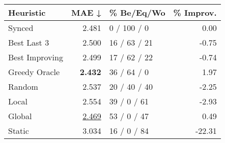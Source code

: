 \begin{tabular}{lrlr}
\toprule
\textbf{Heuristic} & \textbf{MAE ↓} & \textbf{\% Be/Eq/Wo} & \textbf{\% Improv.} \\
\midrule
            Synced &          2.481 &          0 / 100 / 0 &                0.00 \\
\midrule
       Best Last 3 &          2.500 &         16 / 63 / 21 &               -0.75 \\
    Best Improving &          2.499 &         17 / 62 / 22 &               -0.74 \\
\addlinespace
     Greedy Oracle &          \textbf{2.432} &          36 / 64 / 0 &                1.97 \\
            Random &          2.537 &         20 / 40 / 40 &               -2.25 \\
\midrule
             Local &          2.554 &          39 / 0 / 61 &               -2.93 \\
            Global &          \underline{2.469} &          53 / 0 / 47 &                0.49 \\
\midrule
            Static &          3.034 &          16 / 0 / 84 &              -22.31 \\
\bottomrule
\end{tabular}

\label{tab:hr_iid_lr05_le1_bs4_Summary}

